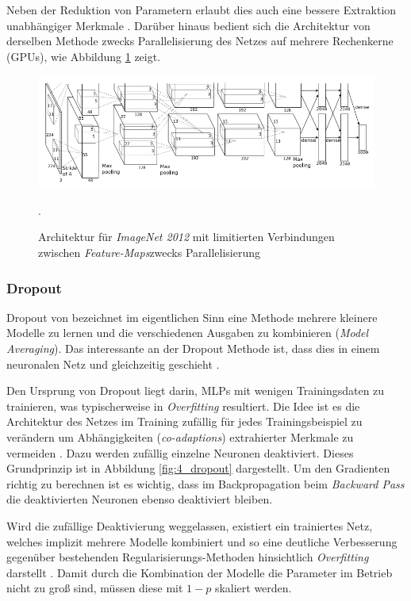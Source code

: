 Neben der Reduktion von Parametern erlaubt dies auch eine bessere Extraktion unabhängiger Merkmale \cite{LeCun1998}. Darüber hinaus bedient sich die Architektur von \cite{Krizhevsky2012} derselben Methode zwecks Parallelisierung des Netzes auf mehrere Rechenkerne (GPUs), wie Abbildung \ref{fig:4_Kriz} zeigt.

\begin{figure}[H]
\centering
\includegraphics[width=0.9\linewidth]{images/4_Kriz}
\caption[]{Architektur für \textit{ImageNet 2012} mit limitierten Verbindungen zwischen \textit{Feature-Maps}zwecks Parallelisierung  \cite[siehe][]{Krizhevsky2012}}.
\label{fig:4_Kriz}
\end{figure}


\subsubsection{Dropout}
\label{ch:dropout}
Dropout von \cite{Hinton2012} bezeichnet im eigentlichen Sinn eine Methode mehrere kleinere Modelle zu lernen und die verschiedenen Ausgaben zu kombinieren (\textit{Model Averaging}). Das interessante an der Dropout Methode ist, dass dies in einem neuronalen Netz und gleichzeitig geschieht \cite[vgl.][]{Srivastava2014}.

Den Ursprung von Dropout liegt darin, MLPs mit wenigen Trainingsdaten zu trainieren, was typischerweise in \textit{Overfitting} resultiert. Die Idee ist es die Architektur des Netzes im Training zufällig für jedes Trainingsbeispiel zu verändern um Abhängigkeiten (\textit{co-adaptions}) extrahierter Merkmale zu vermeiden \cite[vgl.][]{Hinton2012}. Dazu werden zufällig einzelne Neuronen deaktiviert. Dieses Grundprinzip ist in Abbildung \ref{fig:4_dropout} dargestellt. Um den Gradienten richtig zu berechnen ist es wichtig, dass im Backpropagation beim \textit{Backward Pass} die deaktivierten Neuronen ebenso deaktiviert bleiben.

Wird die zufällige Deaktivierung weggelassen, existiert ein trainiertes Netz, welches implizit mehrere Modelle kombiniert und so eine deutliche Verbesserung gegenüber bestehenden Regularisierungs-Methoden hinsichtlich \textit{Overfitting} darstellt \cite[vgl.][]{Srivastava2014}. Damit durch die Kombination der Modelle die Parameter im Betrieb nicht zu groß sind, müssen diese mit ${1-p}$ skaliert werden. 

